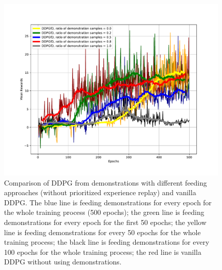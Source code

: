 \documentclass{article}
\begin{document}
\begin{figure}[htbp]
	\centering
	\includegraphics[scale=0.5]{img/ddpgfd2.pdf}
	\caption{Comparison of DDPG from demonstrations with different feeding approaches (without prioritized experience replay) and vanilla DDPG. The blue line is feeding demonstrations for every epoch for the whole training process (500 epochs); the green line is feeding demonstrations for every epoch for the first 50 epochs; the yellow line is feeding demonstrations for every 50 epochs for the whole training process; the black line is feeding demonstrations for every 100 epochs for the whole training process; the red line is vanilla DDPG without using demonstrations. }
	\label{fig:ddpgfd2}
\end{figure}



\medskip
 


\end{document}
